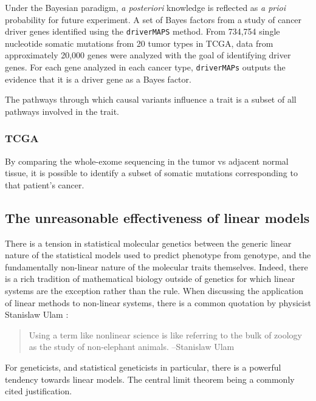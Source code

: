 Under the Bayesian paradigm, \emph{a posteriori} knowledge is reflected as \emph{a prioi} probability for future experiment.  A set of Bayes factors from a study of cancer driver genes identified using the \texttt{driverMAPS} method\cite{drivermaps}.  From 734,754 single nucleotide somatic mutations from 20 tumor types in TCGA, data from approximately 20,000 genes were analyzed with the goal of identifying driver genes. For each gene analyzed in each cancer type, \texttt{driverMAPs} outputs the evidence that it is a driver gene as a Bayes factor.

The pathways through which causal variants influence a trait is a subset of all pathways involved in the trait.



\subsubsection{TCGA}

By comparing the whole-exome sequencing in the tumor vs adjacent normal tissue, it is possible to identify a subset of somatic mutations corresponding to that patient's cancer.

\subsection{The unreasonable effectiveness of linear models}\label{sec:orgd56a398}

There is a tension in statistical molecular genetics between the generic linear nature of the statistical models used to predict phenotype from genotype, and the fundamentally non-linear nature of the molecular traits themselves.  Indeed, there is a 
rich tradition of mathematical biology outside of genetics for which linear systems are the exception rather than the rule.  When discussing the application of linear methods to non-linear systems, there is a common quotation by physicist Stanislaw Ulam \cite{Campbell_2004} :

\begin{quote}
Using a term like nonlinear science is like referring to the bulk of zoology as the study of non-elephant animals. --Stanislaw Ulam
\end{quote}

For geneticists, and statistical geneticists in particular, there is a powerful tendency towards linear models.  The central limit theorem being a commonly cited justification.  